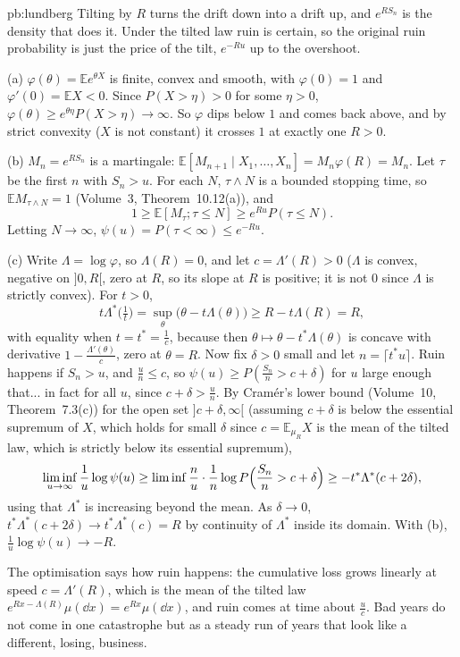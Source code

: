 \begin{solution}{pb:lundberg}
\idea Tilting by $R$ turns the drift down into a drift up, and $e^{RS_n}$ is the density that does it. Under the tilted law ruin is certain, so the original ruin
probability is just the price of the tilt, $e^{-Ru}$ up to the overshoot.

\writeup (a) $\varphi(\theta)=\mathbb Ee^{\theta X}$ is finite, convex and smooth, with $\varphi(0)=1$ and $\varphi'(0)=\mathbb EX<0$. Since $P(X>\eta)>0$ for some $\eta>0$,
$\varphi(\theta)\ge e^{\theta\eta}P(X>\eta)\to\infty$. So $\varphi$ dips below $1$ and comes back above, and by strict convexity ($X$ is not constant) it crosses $1$ at exactly one
$R>0$.

(b) $M_n=e^{RS_n}$ is a martingale: $\mathbb E[M_{n+1}\mid X_1,\dots,X_n]=M_n\varphi(R)=M_n$. Let $\tau$ be the first $n$ with $S_n>u$. For each $N$, $\tau\wedge N$ is a bounded
stopping time, so $\mathbb EM_{\tau\wedge N}=1$ (Volume~3, Theorem~10.12(a)), and
\[
1\ge\mathbb E[M_\tau;\tau\le N]\ge e^{Ru}P(\tau\le N).
\]
Letting $N\to\infty$, $\psi(u)=P(\tau<\infty)\le e^{-Ru}$.

(c) Write $\Lambda=\log\varphi$, so $\Lambda(R)=0$, and let $c=\Lambda'(R)>0$ ($\Lambda$ is convex, negative on $]0,R[$, zero at $R$, so its slope at $R$ is positive; it is not
$0$ since $\Lambda$ is strictly convex). For $t>0$,
\[
t\Lambda^*\bigl(\tfrac1t\bigr)=\sup_\theta\bigl(\theta-t\Lambda(\theta)\bigr)\ge R-t\Lambda(R)=R,
\]
with equality when $t=t^*=\frac1c$, because then $\theta\mapsto\theta-t^*\Lambda(\theta)$ is concave with derivative $1-\frac{\Lambda'(\theta)}c$, zero at $\theta=R$. Now fix
$\delta>0$ small and let $n=\lceil t^*u\rceil$. Ruin happens if $S_n>u$, and $\frac un\le c$, so $\psi(u)\ge P(\frac{S_n}n>c+\delta)$ for $u$ large enough that... in fact for
all $u$, since $c+\delta>\frac un$. By Cram\'er's lower bound (Volume~10, Theorem~7.3(c)) for the open set $]c+\delta,\infty[$ (assuming $c+\delta$ is below the essential
supremum of $X$, which holds for small $\delta$ since $c=\mathbb E_{\mu_R}X$ is the mean of the tilted law, which is strictly below its essential supremum),
\[
\liminf_{u\to\infty}\frac1u\log\psi(u)\ge\liminf\frac nu\cdot\frac1n\log P\Bigl(\frac{S_n}n>c+\delta\Bigr)\ge-t^*\Lambda^*(c+2\delta),
\]
using that $\Lambda^*$ is increasing beyond the mean. As $\delta\to0$, $t^*\Lambda^*(c+2\delta)\to t^*\Lambda^*(c)=R$ by continuity of $\Lambda^*$ inside its domain. With (b),
$\frac1u\log\psi(u)\to-R$.

The optimisation says how ruin happens: the cumulative loss grows linearly at speed $c=\Lambda'(R)$, which is the mean of the tilted law $e^{Rx-\Lambda(R)}\mu(\dd x)=e^{Rx}\mu(\dd x)$,
and ruin comes at time about $\frac uc$. Bad years do not come in one catastrophe but as a steady run of years that look like a different, losing, business.


\end{solution}
